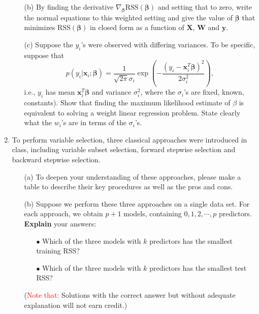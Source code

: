 \documentclass[10pt]{article}
\begin{document}
\begin{enumerate}[1.]
\begin{itemize}
        	\item[(b)] By finding the derivative $\nabla_{\bm{\beta}}\textrm{RSS}(\bm{\beta})$ and setting that to zero, write the normal equations to this weighted setting and give the value of $\bm{\beta}$ that minimizes $\textrm{RSS}(\bm{\beta})$ in closed form as a function of $\bm{X}$, $\bm{W}$ and $\bm{y}$.~
        	
        	\item[(c)] Suppose the $y_{i}$'s were observed with differing variances. To be specific, suppose that
        	\begin{equation}
        		p(y_{i}|\bm{x}_{i};\bm{\beta}) = \frac{1}{\sqrt{2\pi}\sigma_{i}}\exp\left( -\frac{(y_{i}-\bm{x}_{i}^{T}\bm{\beta})^{2}}{2\sigma_{i}^{2}}\right),
        	\end{equation}
		i.e., $y_{i}$ has mean $\bm{x}_{i}^{T}\bm{\beta}$ and variance $\sigma_{i}^{2}$, where the $\sigma_{i}$'s are fixed, known, constants). Show that finding the maximum likelihood estimate of $\beta$ is equivalent to solving a weight linear regression problem. State clearly what the $w_{i}$'s are in terms of the $\sigma_{i}$'s.~    	
        \end{itemize}
    	
    	\item To perform variable selection, three classical approaches were introduced in class, including variable subset selection, forward stepwise selection and backward stepwise selection. 
    	\begin{itemize}
    		\item[(a)] To deepen your understanding of these approaches, please make a table to describe their key procedures as well as the pros and cons.~
    		
    		\item[(b)] Suppose we perform these three approaches on a single data set. For each approach, we obtain $p + 1$
models, containing $0, 1, 2, \cdots, p$ predictors. \textbf{Explain} your answers:
    		\begin{itemize}
    			\item[$\bullet$] Which of the three models with $k$ predictors has the smallest
training \textrm{RSS}? 
    			
    			\item[$\bullet$] Which of the three models with $k$ predictors has the smallest test \textrm{RSS}? 
    		\end{itemize}
    	(\textcolor{red}{Note that:} Solutions with the correct answer but without adequate explanation will not earn credit.)
    	\end{itemize}
    	 

\end{enumerate}
\end{document}
